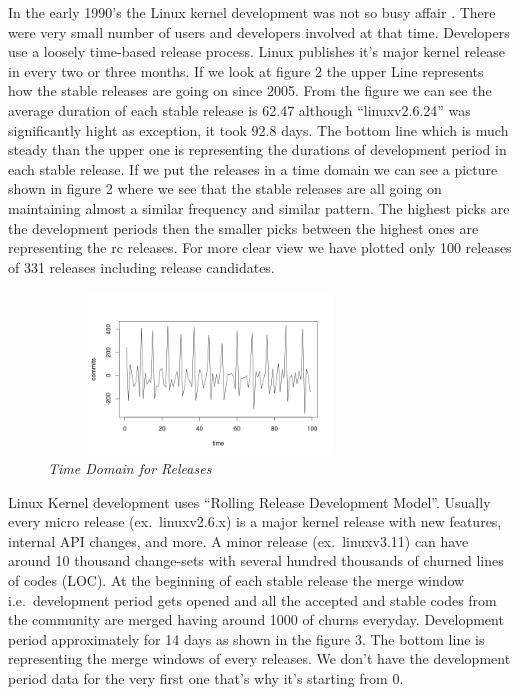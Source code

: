 \documentclass{acm_proc_article-sp}
\begin{document}
In the early 1990's the Linux kernel development was not so busy affair \cite{linux_kernel}. There were very small number of users and developers involved at that time. Developers use a loosely time-based release process. Linux publishes it's major kernel release in every two or three months. If we look at figure 2 the upper Line represents how the stable releases are going on since 2005. From the figure we can see the average duration of each stable release is 62.47 although ``linuxv2.6.24'' was significantly hight as exception, it took 92.8 days. The bottom line which is much steady than the upper one is representing the durations of development period in each stable release. If we put the releases in a time domain we can see a picture shown in figure 2 where we see that the stable releases are all going on maintaining almost a similar frequency and similar pattern. The highest picks are the development periods then the smaller picks between the highest ones are representing the rc releases. For more clear view we have plotted only 100 releases of 331 releases including release candidates.

\begin{figure}
\begin{center}
\includegraphics[height=1.7in,width=3.4in]{relTimeDomain100.png}
\caption{\small \sl Time Domain for Releases}
\end{center}
\end{figure}

Linux Kernel development uses ``Rolling Release Development Model''. Usually every micro release (ex.\ linuxv2.6.x) is a major kernel release with new features, internal API changes, and more. A minor release (ex.\ linuxv3.11) can have around 10 thousand change-sets with several hundred thousands of churned lines of codes (LOC). At the beginning of each stable release the merge window i.e.\ development period gets opened and all the accepted and stable codes from the community are merged having around 1000 of churns everyday. Development period approximately for 14 days as shown in the figure 3. The bottom line is representing the merge windows of every releases. We don't have the development period data for the very first one that's why it's starting from 0.
\end{document}
